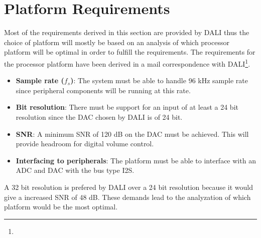 \section{Platform Requirements} \label{sec:platformReq}
Most of the requirements derived in this section are provided by DALI thus the choice of platform will mostly be based on an analysis of which processor platform will be optimal in order to fulfill the requirements. The requirements for the processor platform have been derived in a mail correspondence with DALI\footnote{}.
\begin{itemize}
\item \textbf{Sample rate ($f_s$)}: The system must be able to handle 96 kHz sample rate since peripheral components will be running at this rate.
\item \textbf{Bit resolution}: There must be support for an input of at least a 24 bit resolution since the \gls{DAC} chosen by DALI is of 24 bit.
\item \textbf{\gls{SNR}}: A minimum \gls{SNR} of 120 dB on the \gls{DAC} must be achieved. This will provide headroom for digital volume control.
\item \textbf{Interfacing to peripherals}: The platform must be able to interface with an ADC and DAC with the bus type \gls{I2S}.
\end{itemize}
A 32 bit resolution is prefered by DALI over a 24 bit resolution because it would give a increased \gls{SNR} of 48 dB. These demands lead to the analyzation of which platform would be the most optimal.  


